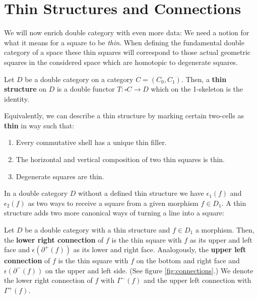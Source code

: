 \section{Thin Structures and Connections}

We will now enrich double category with even more data: We need a notion for
what it means for a square to be \emph{thin}. When defining the fundamental double
category of a space these thin squares will correspond to those actual geometric
squares in the considered space which are homotopic to degenerate squares.

\begin{defn} \label{def:thin-structure}
Let $D$ be a double category on a category $C = (C_0, C_1)$. Then, a \textbf{thin
structure} on $D$ is a double functor $T : \square C \to D$ which on the 1-skeleton
is the identity.

Equivalently, we can describe a thin structure by marking certain two-cells as
\textbf{thin} in way such that:
\begin{enumerate}
\item Every commutative shell has a unique thin filler.
\item The horizontal and vertical composition of two thin squares is thin.
\item Degenerate squares are thin.
\end{enumerate}
\end{defn}

In a double category $D$ without a defined thin structure we have
$\epsilon_1(f)$ and $\epsilon_2(f)$ as two ways to receive a square from a given
morphism $f \in D_1$. A thin structure adds two more canonical ways of turning
a line into a square:

\begin{defn} \label{def:connections}
Let $D$ be a double category with a thin structure and $f \in D_1$ a morphism.
Then, the \textbf{lower right connection} of $f$ is the thin square with $f$ 
as its upper and left face and $\epsilon(\partial^+(f))$ as its lower and right face.
Analogously, the \textbf{upper left connection} of $f$ is the thin square with
$f$ on the bottom and right face and $\epsilon(\partial^-(f))$ on the upper and
left side. (See figure \ref{fig:connections}.)
We denote the lower right connection of $f$ with $\Gamma^-(f)$ and the upper left
connection with $\Gamma^+(f)$.
\end{defn}

